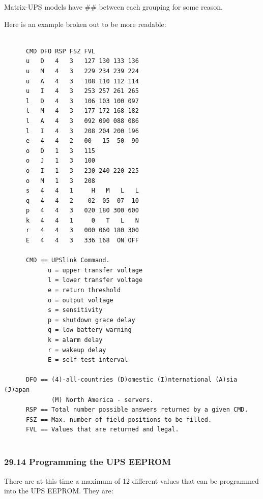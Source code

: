 Matrix-UPS models have \#\# between each grouping for some reason.  

Here is an example broken out to be more readable: 

\footnotesize
\begin{verbatim}
     
      CMD DFO RSP FSZ FVL
      u   D   4   3   127 130 133 136
      u   M   4   3   229 234 239 224
      u   A   4   3   108 110 112 114
      u   I   4   3   253 257 261 265
      l   D   4   3   106 103 100 097
      l   M   4   3   177 172 168 182
      l   A   4   3   092 090 088 086
      l   I   4   3   208 204 200 196
      e   4   4   2   00   15  50  90
      o   D   1   3   115
      o   J   1   3   100
      o   I   1   3   230 240 220 225
      o   M   1   3   208
      s   4   4   1     H   M   L   L
      q   4   4   2    02  05  07  10
      p   4   4   3   020 180 300 600
      k   4   4   1     0   T   L   N
      r   4   4   3   000 060 180 300
      E   4   4   3   336 168  ON OFF
     
      CMD == UPSlink Command.
            u = upper transfer voltage
            l = lower transfer voltage
            e = return threshold
            o = output voltage
            s = sensitivity
            p = shutdown grace delay
            q = low battery warning
            k = alarm delay
            r = wakeup delay
            E = self test interval
     
      DFO == (4)-all-countries (D)omestic (I)nternational (A)sia (J)apan
             (M) North America - servers.
      RSP == Total number possible answers returned by a given CMD.
      FSZ == Max. number of field positions to be filled.
      FVL == Values that are returned and legal.
     
\end{verbatim}
\normalsize

\label{Programming-the-UPS-EEPROM}

\subsubsection*{29.14 Programming the UPS EEPROM}

There are at this time a maximum of 12 different values that can be programmed
into the UPS EEPROM. They are:  

